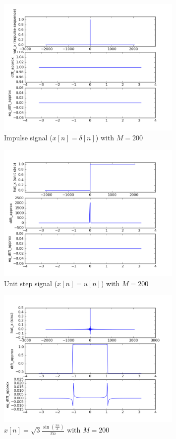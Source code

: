 \begin{figure}[htbp]
	\centering
	\includegraphics[width=0.8\textwidth]{images/p6-3-200}
	\caption{Impulse signal ($x[n] = \delta[n]$) with $M=200$}
	\label{fig:p6-3-200}
\end{figure}

\begin{figure}[htbp]
	\centering
	\includegraphics[width=0.8\textwidth]{images/p6-4-200}
	\caption{Unit step signal ($x[n]=u[n]$) with $M=200$}
	\label{fig:p6-4-200}
\end{figure}

\begin{figure}[htbp]
	\centering
	\includegraphics[width=0.8\textwidth]{images/p6-5-200}
	\caption{$x[n] = \sqrt{3}\frac{\sin(\frac{\pi n}{3})}{\pi n}$ with $M=200$}
	\label{fig:p6-5-200}
\end{figure}




